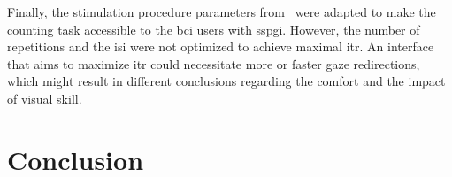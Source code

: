 \documentclass[twocolumn]{article}
\begin{document}
Finally, the stimulation procedure parameters
from~\textcite{VanDenKerchove2024} were adapted to make the counting task
accessible to the \ac{bci} users with \ac{sspgi}.
However, the number of repetitions and the \ac{isi} were not optimized to achieve
maximal \ac{itr}.
An interface that aims to maximize \ac{itr} could necessitate more or faster
gaze redirections, which might result in different conclusions regarding the
comfort and the impact of visual skill.

\section{Conclusion}
\printbibliography
\end{document}

